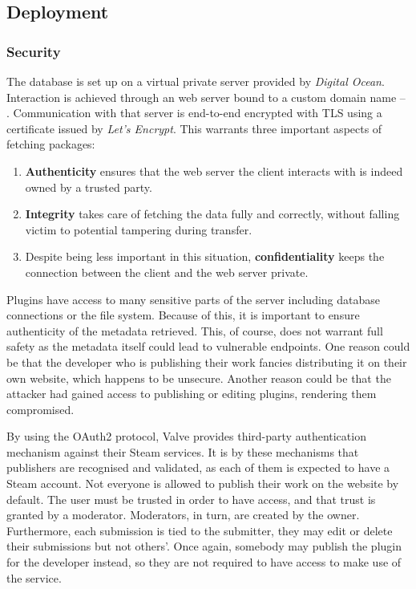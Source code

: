 \subsection{Deployment}

\subsubsection{Security}

The database is set up on a virtual private server provided by \textit{Digital Ocean}.
Interaction is achieved through an web server bound to a custom domain name -- .
Communication with that server is end-to-end encrypted with TLS using a certificate issued by \textit{Let's Encrypt}.
This warrants three important aspects of fetching packages:
\begin{enumerate}
\item \textbf{Authenticity} ensures that the web server the client interacts with is indeed owned by a trusted party.
\item \textbf{Integrity} takes care of fetching the data fully and correctly, without falling victim to potential tampering during transfer.
\item Despite being less important in this situation, \textbf{confidentiality} keeps the connection between the client and the web server private.
\end{enumerate}

Plugins have access to many sensitive parts of the server including database connections or the file system.
Because of this, it is important to ensure authenticity of the metadata retrieved.
This, of course, does not warrant full safety as the metadata itself could lead to vulnerable endpoints.
One reason could be that the developer who is publishing their work fancies distributing it on their own website, which happens to be unsecure.
Another reason could be that the attacker had gained access to publishing or editing plugins, rendering them compromised.

By using the OAuth2 protocol, Valve provides third-party authentication mechanism against their Steam services.
It is by these mechanisms that publishers are recognised and validated, as each of them is expected to have a Steam account.
Not everyone is allowed to publish their work on the website by default.
The user must be trusted in order to have access, and that trust is granted by a moderator.
Moderators, in turn, are created by the owner.
Furthermore, each submission is tied to the submitter, they may edit or delete their submissions but not others'.
Once again, somebody may publish the plugin for the developer instead, so they are not required to have access to make use of the service.


